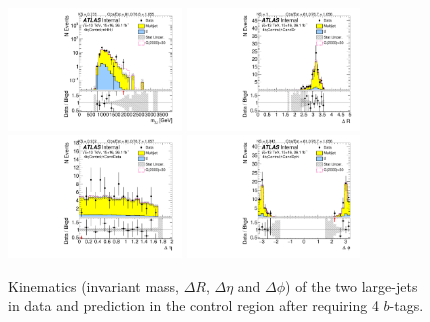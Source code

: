\begin{figure}[htb!]
\begin{center}
\includegraphics[width=0.41\textwidth,angle=-90]{figures/boosted/Control/b77_FourTag_Control_mHH_l_1.pdf}
\includegraphics[width=0.41\textwidth,angle=-90]{figures/boosted/Control/b77_FourTag_Control_hCandDr.pdf}\\
\includegraphics[width=0.41\textwidth,angle=-90]{figures/boosted/Control/b77_FourTag_Control_hCandDeta.pdf}
\includegraphics[width=0.41\textwidth,angle=-90]{figures/boosted/Control/b77_FourTag_Control_hCandDphi.pdf}
  \caption{Kinematics (invariant mass, $\Delta R$, $\Delta \eta$ and $\Delta \phi$) of the two large-\R jets in data and prediction in the control region after requiring 4 $b$-tags.  }
  \label{fig:boosted-4b-control-ak10-system}
\end{center}
\end{figure}

